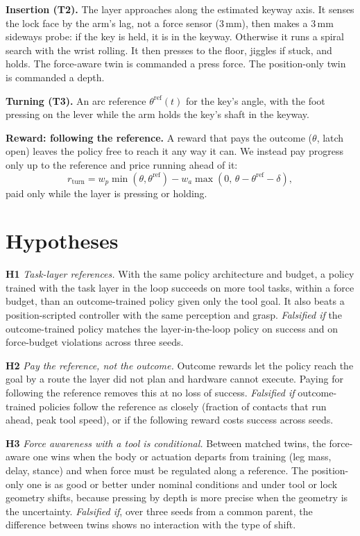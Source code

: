\documentclass[conference]{IEEEtran}
\newcommand{\hyp}[1]{\textbf{H#1}}
\begin{document}
\textbf{Insertion (T2).} The layer approaches along the estimated keyway axis. It senses the lock face by the arm's lag,
not a force sensor (3\,mm), then makes a 3\,mm sideways probe: if the key is held, it is in the keyway. Otherwise it runs
a spiral search with the wrist rolling. It then presses to the floor, jiggles if stuck, and holds. The force-aware twin
is commanded a press force. The position-only twin is commanded a depth.

\textbf{Turning (T3).} An arc reference $\theta^{\mathrm{ref}}(t)$ for the key's angle, with the foot pressing on the
lever while the arm holds the key's shaft in the keyway.

\textbf{Reward: following the reference.} A reward that pays the outcome ($\theta$, latch open) leaves the policy free to
reach it any way it can. We instead pay progress only up to the reference and price running ahead of it:
\begin{equation}
r_{\mathrm{turn}} = w_p \min(\theta, \theta^{\mathrm{ref}}) - w_a \max(0,\, \theta - \theta^{\mathrm{ref}} - \delta),
\end{equation}
paid only while the layer is pressing or holding.

\section{Hypotheses}
\label{sec:hyp}

\hyp{1} \emph{Task-layer references.} With the same policy architecture and budget, a policy trained with the task layer
in the loop succeeds on more tool tasks, within a force budget, than an outcome-trained policy given only the tool goal.
It also beats a position-scripted controller with the same perception and grasp. \emph{Falsified if} the outcome-trained
policy matches the layer-in-the-loop policy on success and on force-budget violations across three seeds.

\hyp{2} \emph{Pay the reference, not the outcome.} Outcome rewards let the policy reach the goal by a route the layer did
not plan and hardware cannot execute. Paying for following the reference removes this at no loss of success.
\emph{Falsified if} outcome-trained policies follow the reference as closely (fraction of contacts that run ahead, peak
tool speed), or if the following reward costs success across seeds.

\hyp{3} \emph{Force awareness with a tool is conditional.} Between matched twins, the force-aware one wins when the body
or actuation departs from training (leg mass, delay, stance) and when force must be regulated along a reference. The
position-only one is as good or better under nominal conditions and under tool or lock geometry shifts, because pressing
by depth is more precise when the geometry is the uncertainty. \emph{Falsified if}, over three seeds from a common parent,
the difference between twins shows no interaction with the type of shift.
\end{document}
